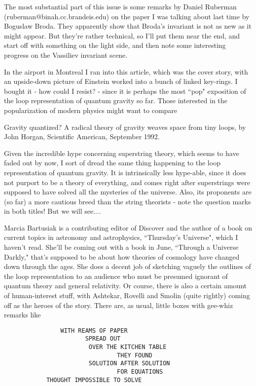 
The most substantial part of this issue is some remarks by Daniel Ruberman (ruberman@binah.cc.brandeis.edu) on the paper I was talking about last time by Boguslaw Broda. They apparently show that Broda's invariant is not as new as it might appear. But they're rather technical, so I'll put them near the end, and start off with something on the light side, and then note some interesting progress on the Vassiliev invariant scene.


In the airport in Montreal I ran into this article, which was the cover story, with an upside-down picture of Einstein worked into a bunch of linked key-rings. I bought it - how could I resist? - since it is perhaps the most ``pop" exposition of the loop representation of quantum gravity so far. Those interested in the popularization of modern physics might want to compare

Gravity quantized? A radical theory of gravity weaves space from tiny loops, by John Horgan, Scientific American, September 1992.

Given the incredible hype concerning superstring theory, which seems to have faded out by now, I sort of dread the same thing happening to the loop representation of quantum gravity. It is intrinsically less hype-able, since it does not purport to be a theory of everything, and comes right after superstrings were supposed to have solved all the mysteries of the universe. Also, its proponents are (so far) a more cautious breed than the string theorists - note the question marks in both titles! But we will see....

Marcia Bartusiak is a contributing editor of Discover and the author of a book on current topics in astronomy and astrophysics, ``Thursday's Universe", which I haven't read. She'll be coming out with a book in June, ``Through a Universe Darkly," that's supposed to be about how theories of cosmology have changed down through the ages. She does a decent job of sketching vaguely the outlines of the loop representation to an audience who must be presumed ignorant of quantum theory and general relativity. Or course, there is also a certain amount of human-interest stuff, with Ashtekar, Rovelli and Smolin (quite rightly) coming off as the heroes of the story. There are, as usual, little boxes with gee-whiz remarks like
\begin{verbatim}
                WITH REAMS OF PAPER
            	       SPREAD OUT
		                OVER THE KITCHEN TABLE
			                    THEY FOUND
		                SOLUTION AFTER SOLUTION
			                    FOR EQUATIONS
            THOUGHT IMPOSSIBLE TO SOLVE
\end{verbatim}
			

